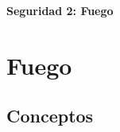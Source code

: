 \begin{titlepage}
   \begin{center}
       \vspace*{9cm}
       \LARGE
       \textbf{Seguridad 2: Fuego}

      
   
            
       \vspace{0.8cm}
     
      
   \end{center}
\end{titlepage}
\section{Fuego }
\subsection{Conceptos}
